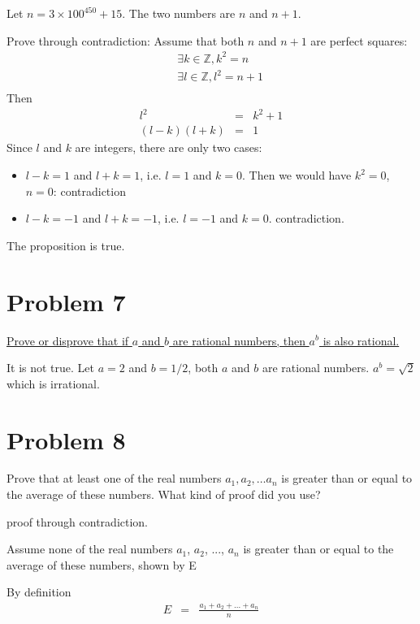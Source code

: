 \documentclass[11pt]{article}
\begin{document}
{	
	Let $n=3\times 100^{450} + 15$. The two numbers are $n$ and $n+1$. 
	
	Prove through contradiction:  Assume that both $n$ and $n+1$ are perfect squares:
	\begin{eqnarray*}
	&&\exists k \in \mathbb{Z}, k^2 = n \\
	&&\exists l \in \mathbb{Z}, l^2 = n + 1\\
	\end{eqnarray*}
	Then
	\begin{eqnarray*}
	l^2 &=& k^2 + 1 \\
	(l-k)(l+k) &=& 1
	\end{eqnarray*}
	Since $l$ and $k$ are integers, there are only two cases:
	\begin{itemize}
	\item $l-k=1$ and $l+k=1$, i.e. $l=1$ and $k=0$. Then we would have $k^2=0$, $n=0$: contradiction
	\item $l-k=-1$ and $l+k=-1$, i.e. $l=-1$ and $k=0$.  contradiction.
	\end{itemize}
	The proposition is true.
		
	\section*{Problem 7}
	\underline{Prove or disprove that if $a$ and $b$ are rational numbers, then $a^b$ is also rational.}
		
		
		It is not true. Let $a = 2$ and $b = 1/2$, both $a$ and $b$ are rational numbers. $a^{b}= \sqrt{2}$ which is irrational.
	\section*{Problem 8}
	Prove that at least one of the real numbers $a_1, a_2, \ldots a_n$ is greater than or equal to the average of these numbers. What kind of proof did you use?\newline
		
		proof through contradiction. 
		
		Assume none of the real numbers $a_{1}$, $a_{2}$, ..., $a_{n}$ is greater than or equal to the average of these numbers, shown by E
		
		By definition
		\begin{eqnarray*}
		E & = & \frac{a_{1} + a_{2} + ... + a_{n}}{n}
		\end{eqnarray*}
		
}
\end{document}
